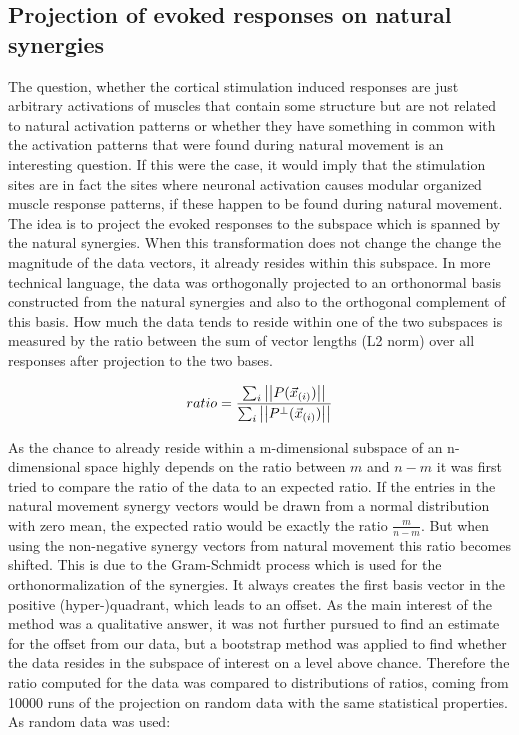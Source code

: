\subsection{Projection of evoked responses on natural synergies} %
\label{sg:sub:projection}

The question, whether the cortical stimulation induced responses are just arbitrary activations of muscles that contain some structure but are not related to natural activation patterns or whether they have something in common with the activation patterns that were found during natural movement is an interesting question. If this were the case, it would imply that the stimulation sites are in fact the sites where neuronal activation causes modular organized muscle response patterns, if these happen to be found during natural movement. The idea is to project the evoked responses to the subspace which is spanned by the natural synergies. When this transformation does not change the change the magnitude of the data vectors, it already resides within this subspace. In more technical language, the data was orthogonally projected to an orthonormal basis constructed from the natural synergies and also to the orthogonal complement of this basis. How much the data tends to reside within one of the two subspaces is measured by the ratio between the sum of vector lengths (L2 norm) over all responses after projection to the two bases.

\begin{equation}
	ratio = \frac
		{\sum_{i} \left|\left|P(\vec{x}_{(i)})\right|\right|} 
		{\sum_{i} \left|\left|P^{\perp}(\vec{x}_{(i)})\right|\right|}
\end{equation}

As the chance to already reside within a m-dimensional subspace of an n-dimensional space highly depends on the ratio between $m$ and $n - m$ it was first tried to compare the ratio of the data to an expected ratio. If the entries in the natural movement synergy vectors would be drawn from a normal distribution with zero mean, the expected ratio would be exactly the ratio $\frac{m}{n - m}$. But when using the non-negative synergy vectors from natural movement this ratio becomes shifted. This is due to the Gram-Schmidt process which is used for the orthonormalization of the synergies. It always creates the first basis vector in the positive (hyper-)quadrant, which leads to an offset. As the main interest of the method was a qualitative answer, it was not further pursued to find an estimate for the offset from our data, but a bootstrap method was applied to find whether the data resides in the subspace of interest on a level above chance. Therefore the ratio computed for the data was compared to distributions of ratios, coming from 10000 runs of the projection on random data with the same statistical properties. As random data was used:


